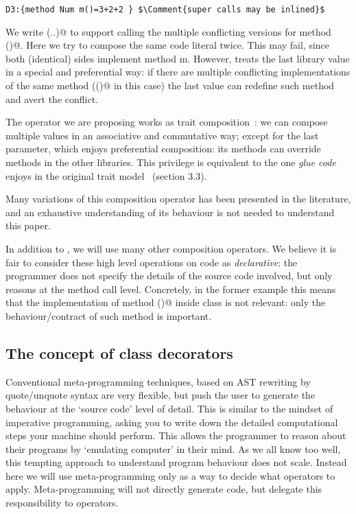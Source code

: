 \begin{lstlisting}
D3:{method Num m()=3+2+2 } $\Comment{super calls may be inlined}$
\end{lstlisting}

We write (..)@ to support calling the multiple conflicting versions
for method \Q@m()@.
Here we try to compose the same code literal twice.
This may fail, since both (identical) sides implement method m.
However, \Q@Override@ treats the last library value in a special
 and preferential way:
if there are multiple conflicting implementations of the same method 
(\Q@m()@ in this case)
the last value can redefine such method and avert the conflict.

The \Q@Override@ operator we are proposing works as 
trait composition~\cite{scharli2003traits}:
we can compose multiple \Q@Library@ values in
an associative and commutative way;
except for the last parameter, which
enjoys preferential composition:
its methods can override methods in the other
libraries. This privilege is equivalent to the 
one \emph{glue code} enjoys in the original trait model 
~\cite{scharli2003traits}(section 3.3).


Many variations of this composition operator has been presented in the literature,
and an exhaustive understanding of its behaviour is not needed to
understand this paper.

In addition to \Q@Override@, we will use many other composition operators.
We believe it is fair to consider these high level operations on code as \emph{declarative}:
 the programmer does not specify the details of the source code
involved, but only reasons at the method call level.
Concretely, in the former example this means that the implementation of method \Q@m()@
inside class \Q@C@ is not relevant: only the behaviour/contract of such method is important.





\subsection*{The concept of class decorators}

Conventional meta-programming techniques, based on AST rewriting by quote/unquote syntax
are very flexible, but push the user to generate the behaviour at the `source code' level of detail.
This is similar to the mindset of imperative programming, asking you to write down the
detailed computational steps your machine should perform.
This allows the programmer to reason about their programs by `emulating computer' in their mind.
As we all know too well, this tempting approach to understand  program behaviour does not scale.
Instead here we will use meta-programming only as a way to decide what operators to apply. Meta-programming will not directly generate code, but delegate this responsibility to operators.

